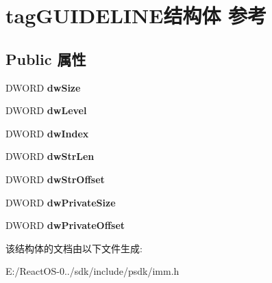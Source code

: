 \hypertarget{structtag_g_u_i_d_e_l_i_n_e}{}\section{tag\+G\+U\+I\+D\+E\+L\+I\+N\+E结构体 参考}
\label{structtag_g_u_i_d_e_l_i_n_e}
\subsection*{Public 属性}
\begin{DoxyCompactItemize}
\item 
\mbox{\label{structtag_g_u_i_d_e_l_i_n_e_ab9e77dedb3cec1e605bfadb23fa6871f}} 
D\+W\+O\+RD {\bfseries dw\+Size}
\item 
\mbox{\label{structtag_g_u_i_d_e_l_i_n_e_ad974594deb9ed334075989e1c77e0196}} 
D\+W\+O\+RD {\bfseries dw\+Level}
\item 
\mbox{\label{structtag_g_u_i_d_e_l_i_n_e_aadba3bcaa930a30f6c8dbede43466f49}} 
D\+W\+O\+RD {\bfseries dw\+Index}
\item 
\mbox{\label{structtag_g_u_i_d_e_l_i_n_e_a9e518a3b11ee3063098f78e0e2c35cd5}} 
D\+W\+O\+RD {\bfseries dw\+Str\+Len}
\item 
\mbox{\label{structtag_g_u_i_d_e_l_i_n_e_a3f675579d2ed32b2e92f92a77414f371}} 
D\+W\+O\+RD {\bfseries dw\+Str\+Offset}
\item 
\mbox{\label{structtag_g_u_i_d_e_l_i_n_e_a86dcdafd6873e7a8a7c997b283c80083}} 
D\+W\+O\+RD {\bfseries dw\+Private\+Size}
\item 
\mbox{\label{structtag_g_u_i_d_e_l_i_n_e_afe494b60eff85f097cce03017ea915e9}} 
D\+W\+O\+RD {\bfseries dw\+Private\+Offset}
\end{DoxyCompactItemize}


该结构体的文档由以下文件生成\+:\begin{DoxyCompactItemize}
\item 
E\+:/\+React\+O\+S-\/0../sdk/include/psdk/imm.\+h\end{DoxyCompactItemize}

